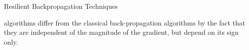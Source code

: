 \begin{chapter}{Resilient Backpropagation Techniques}
    \par {} algorithms differ from the classical back-propagation algorithms by the fact that they are independent of the magnitude of the gradient, but depend on its sign only.
    
    
\end{chapter}